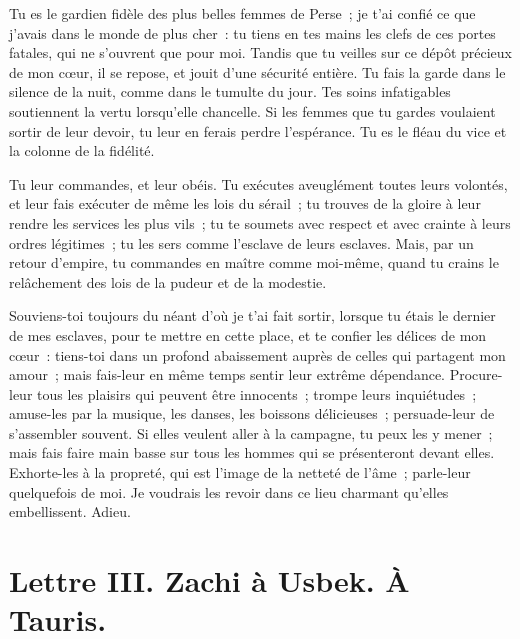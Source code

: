 \documentclass[french,twoside]{book} %
\newcommand{\dateline}[1]{\medskip{\RaggedLeft{#1}\par}\bigskip}
\begin{document}
\noindent Tu es le gardien fidèle des plus belles femmes de Perse ; je t’ai confié ce que j’avais dans le monde de plus cher : tu tiens en tes mains les clefs de ces portes fatales, qui ne s’ouvrent que pour moi. Tandis que tu veilles sur ce dépôt précieux de mon cœur, il se repose, et jouit d’une sécurité entière. Tu fais la garde dans le silence de la nuit, comme dans le tumulte du jour. Tes soins infatigables soutiennent la vertu lorsqu’elle chancelle. Si les femmes que tu gardes voulaient sortir de leur devoir, tu leur en ferais perdre l’espérance. Tu es le fléau du vice et la colonne de la fidélité.\par
Tu leur commandes, et leur obéis. Tu exécutes aveuglément toutes leurs volontés, et leur fais exécuter de même les lois du sérail ; tu trouves de la gloire à leur rendre les services les plus vils ; tu te soumets avec respect et avec crainte à leurs ordres légitimes ; tu les sers comme l’esclave de leurs esclaves. Mais, par un retour d’empire, tu commandes en maître comme moi-même, quand tu crains le relâchement des lois de la pudeur et de la modestie.\par
Souviens-toi toujours du néant d’où je t’ai fait sortir, lorsque tu étais le dernier de mes esclaves, pour te mettre en cette place, et te confier les délices de mon cœur : tiens-toi dans un profond abaissement auprès de celles qui partagent mon amour ; mais fais-leur en même temps sentir leur extrême dépendance. Procure-leur tous les plaisirs qui peuvent être innocents ; trompe leurs inquiétudes ; amuse-les par la musique, les danses, les boissons délicieuses ; persuade-leur de s’assembler souvent. Si elles veulent aller à la campagne, tu peux les y mener ; mais fais faire main basse sur tous les hommes qui se présenteront devant elles. Exhorte-les à la propreté, qui est l’image de la netteté de l’âme ; parle-leur quelquefois de moi. Je voudrais les revoir dans ce lieu charmant qu’elles embellissent. Adieu.\par

\dateline{De Tauris, le 18 de la lune de Saphar, 1711}
\section[{Lettre III. Zachi à Usbek. À Tauris.}]{Lettre III. Zachi à Usbek. À Tauris.}\renewcommand{\leftmark}{Lettre III. Zachi à Usbek. À Tauris.}
\end{document}
